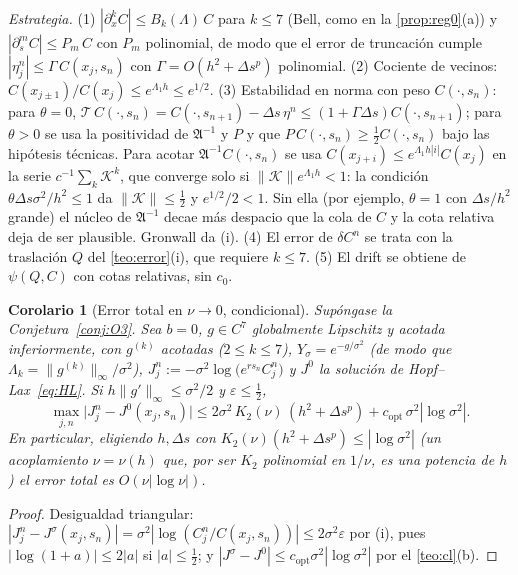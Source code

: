 \documentclass[11pt,letterpaper]{article}
\theoremstyle{plain}
\newtheorem{corolario}[theorem]{Corolario}
\theoremstyle{definition}
\theoremstyle{remark}
\numberwithin{equation}{section}
\newcommand{\norm}[1]{\lVert #1\rVert}
\newcommand{\Top}{\mathcal{T}}
\begin{document}
	\emph{Estrategia.} (1) \(|\partial_x^kC|\le B_k(\Lambda)\,C\) para \(k\le7\) (Bell, como en la \cref{prop:reg0}(a)) y \(|\partial_s^mC|\le P_m\,C\) con \(P_m\) polinomial, de modo que el error de truncación cumple \(|\eta^n_j|\le\Gamma\,C(x_j,s_n)\) con \(\Gamma=O(h^2+\Delta s^p)\) polinomial. (2) Cociente de vecinos: \(C(x_{j\pm1})/C(x_j)\le e^{\Lambda_1h}\le e^{1/2}\). (3) Estabilidad en norma con peso \(C(\cdot,s_n)\): para \(\theta=0\), \(\Top\,C(\cdot,s_n)=C(\cdot,s_{n+1})-\Delta s\,\eta^n\le(1+\Gamma\Delta s)C(\cdot,s_{n+1})\); para \(\theta>0\) se usa la positividad de \(\mathfrak A^{-1}\) y \(P\) y que \(P\,C(\cdot,s_n)\ge\frac12C(\cdot,s_n)\) bajo las hipótesis técnicas. Para acotar \(\mathfrak A^{-1}C(\cdot,s_n)\) se usa \(C(x_{j+i})\le e^{\Lambda_1h|i|}C(x_j)\) en la serie \(c^{-1}\sum_k\mathcal K^k\), que converge solo si \(\norm{\mathcal K}e^{\Lambda_1h}<1\): la condición \(\theta\Delta s\sigma^2/h^2\le1\) da \(\norm{\mathcal K}\le\frac12\) y \(e^{1/2}/2<1\). Sin ella (por ejemplo, \(\theta=1\) con \(\Delta s/h^2\) grande) el núcleo de \(\mathfrak A^{-1}\) decae más despacio que la cola de \(C\) y la cota relativa deja de ser plausible. Gronwall da (i). (4) El error de \(\delta C^n\) se trata con la traslación \(Q\) del \cref{teo:error}(i), que requiere \(k\le7\). (5) El drift se obtiene de \(\psi(Q,C)\) con cotas relativas, sin \(c_0\).
	
	\begin{corolario}[Error total en \(\nu\to0\), condicional]\label{cor:total}
		Supóngase la Conjetura~\ref{conj:O3}. Sea \(b=0\), \(g\in C^7\) globalmente Lipschitz y acotada inferiormente, con \(g^{(k)}\) acotadas (\(2\le k\le7\)), \(Y_\sigma=e^{-g/\sigma^2}\) (de modo que \(\Lambda_k=\|g^{(k)}\|_\infty/\sigma^2\)), \(J^n_j:=-\sigma^2\log\bigl(e^{rs_n}C^n_j\bigr)\) y \(J^0\) la solución de Hopf--Lax~\eqref{eq:HL}. Si \(h\|g'\|_\infty\le\sigma^2/2\) y \(\varepsilon\le\frac12\),
		\[
		\max_{j,n}\bigl|J^n_j-J^0(x_j,s_n)\bigr|\le2\sigma^2\,K_2(\nu)\,(h^2+\Delta s^p)+c_{\mathrm{opt}}\,\sigma^2|\log\sigma^2|.
		\]
		En particular, eligiendo \(h,\Delta s\) con \(K_2(\nu)(h^2+\Delta s^p)\le|\log\sigma^2|\) (un acoplamiento \(\nu=\nu(h)\) que, por ser \(K_2\) polinomial en \(1/\nu\), es una potencia de \(h\)) el error total es \(O(\nu|\log\nu|)\).
	\end{corolario}
	
	\begin{proof}
		Desigualdad triangular: \(|J^n_j-J^\sigma(x_j,s_n)|=\sigma^2|\log(C^n_j/C(x_j,s_n))|\le2\sigma^2\varepsilon\) por (i), pues \(|\log(1+a)|\le2|a|\) si \(|a|\le\frac12\); y \(|J^\sigma-J^0|\le c_{\mathrm{opt}}\sigma^2|\log\sigma^2|\) por el \cref{teo:cl}(b).
	\end{proof}
	
\end{document}
